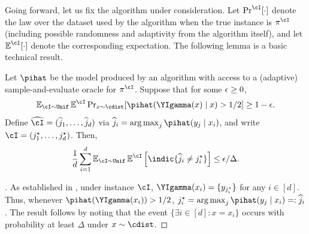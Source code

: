 Going forward, let us fix the algorithm under consideration. Let $\Pnki\brk{\cdot}$ denote the law over the dataset used by the
algorithm when the true instance is $\pi^{\cI}$ (including possible
randomness and adaptivity from the algorithm itself), and let
$\Enki\brk{\cdot}$ denote the corresponding expectation. The following lemma is a basic
technical result.
\begin{lemma}\label{lem:redux_to_classification} Let $\pihat$ be
  the model produced by an algorithm with access to a
  (adaptive) sample-and-evaluate oracle for $\pi^{\cI}$. Suppose that for some $\epsilon\geq{}0$,
\begin{align}
    \EnI\Enki\Pr_{x \sim \cdist}[\pihat(\YIgamma(x)\mid{}x) > 1/2] \ge 1 - \epsilon. \label{eq:EnIlb}
\end{align}
Define $\wh \cI = (\wh j_1,\dots, \wh j_d)$ via $\wh{j}_i = \argmax_j\pihat(y_j \mid x_i)$, and write $\cI = (j_1^\star,\dots,j_d^\star)$.  Then, 
\begin{align}
    \frac{1}{d}\sum_{i=1}^d\EnI\Enki\left[ \indic\{\wh{j}_i \ne j_i^\star\}\right] \le \epsilon/\Delta.
\end{align}
\end{lemma}


\begin{proof}[] As established in
  , under instance $\cI$, $\YIgamma(x_i) =
  \{y_{j_i^\star}\}$ for any $i \in [d]$. Thus, whenever
  $\pihat(\YIgamma(x_i)) > 1/2$, $j_i^\star = \argmax_j \pihat(y_j
  \mid x_i) =: \wh{j}_i$. The result follows by noting that the event
  $\{\exists i \in [d]: x = x_i\}$ occurs with probability at least
  $\Delta$ under $x\sim\cdist$.
\end{proof}

\newcommand{\Priunif}{\Pr_{i,\mathrm{unif}}}


